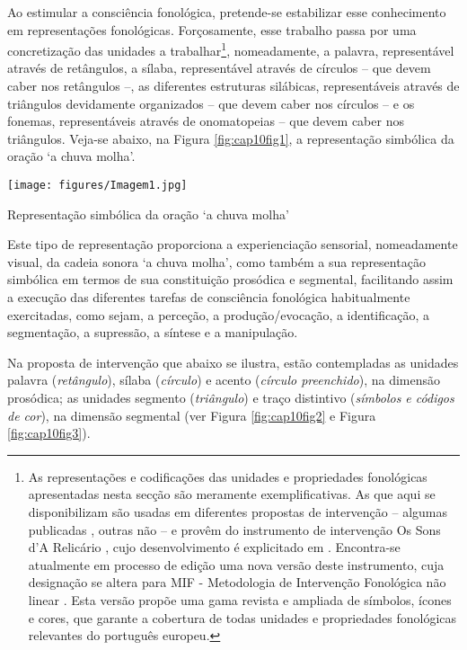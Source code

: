 \documentclass[output=paper,colorlinks,citecolor=brown,booklanguage=portuguese]{langscibook}
\begin{document}
Ao estimular a consciência fonológica, pretende-se estabilizar esse conhecimento em representações fonológicas. Forçosamente, esse trabalho passa por uma concretização das unidades a trabalhar\footnote{As representações e codificações das unidades e propriedades fonológicas apresentadas nesta secção são meramente exemplificativas. As que aqui se disponibilizam são usadas em diferentes propostas de intervenção -- algumas publicadas \citep{Freitas2007, Carvalho2012, Carvalho2017}, outras não -- e provêm do instrumento de intervenção Os Sons d’A Relicário \citep{Alves2011}, cujo desenvolvimento é explicitado em \citet{Alves2014a}. Encontra-se atualmente em processo de edição uma nova versão deste instrumento, cuja designação se altera para MIF - Metodologia de Intervenção Fonológica não linear \citep{Alvesemprep.}. Esta versão propõe uma gama revista e ampliada de símbolos, ícones e cores, que garante a cobertura de todas unidades e propriedades fonológicas relevantes do português europeu.}, nomeadamente, a palavra, representável através de retângulos, a sílaba, representável através de círculos -- que devem caber nos retângulos --, as diferentes estruturas silábicas, representáveis através de triângulos devidamente organizados -- que devem caber nos círculos -- e os fonemas, representáveis através de onomatopeias -- que devem caber nos triângulos. Veja-se abaixo, na Figura \ref{fig:cap10fig1}, a representação simbólica da oração ‘a chuva molha’.


\begin{Figura}
    \centering
    \texttt{[image: figures/Imagem1.jpg]}


    \caption{{ Representação simbólica da oração ‘a chuva molha’}}
    \label{fig:cap10fig1}
\end{Figura}


Este tipo de representação proporciona a experienciação sensorial, nomeadamente visual, da cadeia sonora ‘a chuva molha’, como também a sua representação simbólica em termos de sua constituição prosódica e segmental, facilitando assim a execução das diferentes tarefas de consciência fonológica habitualmente exercitadas, como sejam, a perceção, a produção/evocação, a identificação, a segmentação, a supressão, a síntese e a manipulação. 

Na proposta de intervenção que abaixo se ilustra, estão contempladas as unidades palavra (\emph{retângulo}), sílaba (\emph{círculo}) e acento (\emph{círculo preenchido}), na dimensão prosódica; as unidades segmento (\emph{triângulo}) e traço distintivo (\emph{símbolos e códigos de cor}), na dimensão segmental (ver Figura \ref{fig:cap10fig2} e Figura \ref{fig:cap10fig3}).
\end{document}
